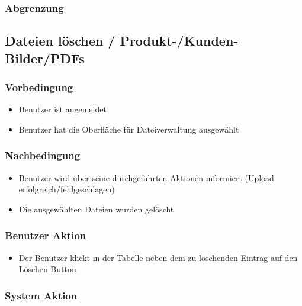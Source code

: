\documentclass[a4paper,12pt]{article}
\begin{document}
\subsubsection{Abgrenzung}\label{abgrenzung-12}

\subsection{Dateien löschen / Produkt-/Kunden- Bilder/PDFs}\label{dateien-loschen-produkt-kunden--bilderpdfs}

\subsubsection{Vorbedingung}\label{vorbedingung-13}

\begin{itemize}

\item
  Benutzer ist angemeldet
\item
  Benutzer hat die Oberfläche für Dateiverwaltung ausgewählt
\end{itemize}

\subsubsection{Nachbedingung}\label{nachbedingung-13}

\begin{itemize}

\item
  Benutzer wird über seine durchgeführten Aktionen informiert (Upload
  erfolgreich/fehlgeschlagen)
\item
  Die ausgewählten Dateien wurden gelöscht
\end{itemize}

\subsubsection{Benutzer Aktion}\label{benutzer-aktion-13}

\begin{itemize}

\item
  Der Benutzer klickt in der Tabelle neben dem zu löschenden Eintrag auf
  den Löschen Button
\end{itemize}

\subsubsection{System Aktion}\label{system-aktion-13}
\end{document}
